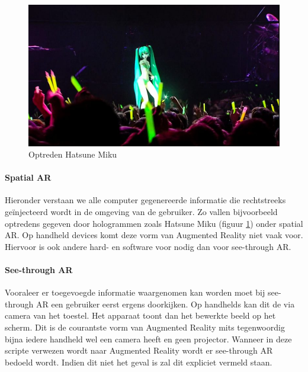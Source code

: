 \documentclass[pdftex,a4paper,12pt,twoside]{report}
\begin{document}
\begin{figure}
\vspace{-15pt}

\includegraphics[scale=0.22]{miku} 
\caption{Optreden Hatsune Miku \citep{miku}}  \label{fig:miku}
\vspace{-20pt}
\end{figure}

\paragraph{Spatial AR}
Hieronder verstaan we alle computer gegenereerde informatie die rechtstreeks ge\"injecteerd wordt in de omgeving van de gebruiker. Zo vallen bijvoorbeeld optredens gegeven door hologrammen zoals Hatsune Miku (figuur \ref{fig:miku}) onder spatial AR. Op handheld devices komt deze vorm van Augmented Reality niet vaak voor. Hiervoor is ook andere hard- en software voor nodig dan voor see-through AR.

\paragraph{See-through AR}
Vooraleer er toegevoegde informatie waargenomen kan worden moet bij see-through AR een gebruiker eerst ergens doorkijken. Op handhelds kan dit de via camera van het toestel. Het apparaat toont dan het bewerkte beeld op het scherm. Dit is de courantste vorm van Augmented Reality mits tegenwoordig bijna iedere handheld wel een camera heeft en geen projector. Wanneer in deze scripte verwezen wordt naar Augmented Reality wordt er see-through AR bedoeld wordt. Indien dit niet het geval is zal dit expliciet vermeld staan.
\end{document}
